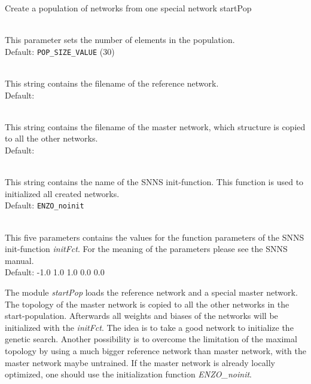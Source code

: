 \begin{moduledoc}{Create a population of networks from one special network}
       {startPop}
  \item[\KeyWord{popsize} \optParam{ x } ]~\\
    This parameter sets the number of elements in the population.\\ 
    Default: {\tt POP\_SIZE\_VALUE} (30)
  \item[\KeyWord{network} \optParam{ x } ]~\\
    This string contains the filename of the reference network.\\
    Default:  {}              
  \item[\KeyWord{startnet} \optParam{ x } ]~\\
    This string contains the filename of the master network, which
    structure is copied to all the other networks.\\
    Default: {}
  \item[\KeyWord{initFct} \optParam{ x } ]~\\
    This string contains the name of the SNNS init-function.
    This function is used to initialized all created networks.\\
    Default: {\tt ENZO\_noinit} 
  \item[\KeyWord{initParam} \optParam{ x } ]~\\
    This five parameters contains the values for the function parameters of the 
    SNNS init-function {\it initFct}. 
    For the meaning of the parameters please see the SNNS manual.\\
    Default: -1.0 1.0 1.0 0.0 0.0
\end{moduledoc}

The module {\it startPop} loads the reference network and a special master network.
The topology of the master network is copied to all the other networks in the start-population.
Afterwards all weights and biases of the networks will be initialized with the
{\it initFct}. 
The idea is to take a good network to initialize the genetic search.
Another possibility is to overcome the limitation of the maximal topology by
using a much bigger reference network than master network, with the master network
maybe untrained. If the master network is already locally optimized, one should use
the initialization function {\it ENZO\_noinit}.  






